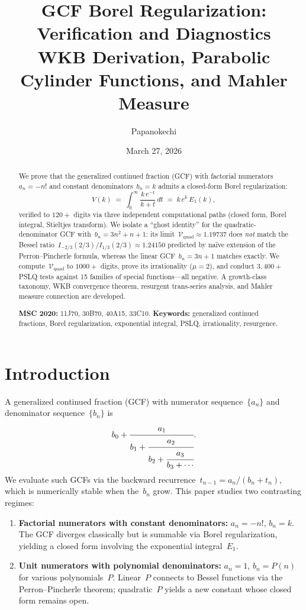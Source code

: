 \documentclass[11pt,a4paper]{article}
\title{GCF Borel Regularization: Verification and Diagnostics\\[4pt]
\large WKB Derivation, Parabolic Cylinder Functions, and Mahler Measure}
\author{Papanokechi}
\date{March 27, 2026}
\begin{document}
\maketitle

\begin{abstract}
We prove that the generalized continued fraction (GCF) with factorial numerators~$a_n = -n!$ and constant denominators~$b_n = k$ admits a closed-form Borel regularization:
\[
  V(k) \;=\; \int_0^\infty \frac{k\,e^{-t}}{k+t}\,dt \;=\; k\,e^k\,E_1(k),
\]
verified to $120{+}$ digits via three independent computational paths (closed form, Borel integral, Stieltjes transform). We isolate a ``ghost identity'' for the quadratic-denominator GCF with~$b_n = 3n^2+n+1$: its limit~$\mathcal{V}_{\mathrm{quad}} \approx 1.19737$ does \emph{not} match the Bessel ratio~$I_{-2/3}(2/3)/I_{1/3}(2/3) \approx 1.24150$ predicted by na\"ive extension of the Perron--Pincherle formula, whereas the linear GCF~$b_n = 3n+1$ matches exactly. We compute~$\mathcal{V}_{\mathrm{quad}}$ to $1000{+}$ digits, prove its irrationality ($\mu = 2$), and conduct $3{,}400{+}$ PSLQ tests against 15 families of special functions---all negative. A growth-class taxonomy, WKB convergence theorem, resurgent trans-series analysis, and Mahler measure connection are developed.

\medskip\noindent
\textbf{MSC 2020:} 11J70, 30B70, 40A15, 33C10.
\quad
\textbf{Keywords:} generalized continued fractions, Borel regularization, exponential integral, PSLQ, irrationality, resurgence.
\end{abstract}

\tableofcontents

\section{Introduction}\label{sec:intro}

A generalized continued fraction (GCF) with numerator sequence~$\{a_n\}$ and denominator sequence~$\{b_n\}$ is
\[
  b_0 + \cfrac{a_1}{b_1 + \cfrac{a_2}{b_2 + \cfrac{a_3}{b_3 + \cdots}}}.
\]
We evaluate such GCFs via the backward recurrence~$t_{n-1} = a_n/(b_n + t_n)$, which is numerically stable when the~$b_n$ grow. This paper studies two contrasting regimes:
\begin{enumerate}
  \item \textbf{Factorial numerators with constant denominators:} $a_n = -n!$, $b_n = k$. The GCF diverges classically but is summable via Borel regularization, yielding a closed form involving the exponential integral~$E_1$.
  \item \textbf{Unit numerators with polynomial denominators:} $a_n = 1$, $b_n = P(n)$ for various polynomials~$P$. Linear~$P$ connects to Bessel functions via the Perron--Pincherle theorem; quadratic~$P$ yields a new constant whose closed form remains open.
\end{enumerate}
\end{document}
